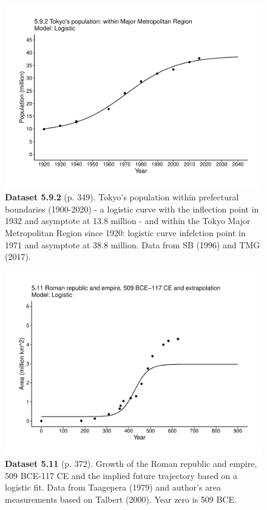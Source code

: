\documentclass[aps,rmp,preprint,superscriptaddress,10pt,onecolumn]{article}
\begin{document}
\clearpage
\begin{figure}[h]
\includegraphics[width=\textwidth]{output/figs-ggplot/5.9.2.pdf}
\caption*{\textbf{Dataset 5.9.2} (p. 349). Tokyo's population within prefectural boundaries (1900-2020) - a logistic curve with the inflection point in 1932 and asymptote at 13.8 million - and within the Tokyo Major Metropolitan Region since 1920: logistic curve infelction point in 1971 and asymptote at 38.8 million. Data from SB (1996) and TMG (2017). }
\end{figure}
	
\clearpage
\begin{figure}[h]
\includegraphics[width=\textwidth]{output/figs-ggplot/5.11.pdf}
\caption*{\textbf{Dataset 5.11} (p. 372). Growth of the Roman republic and empire, 509 BCE-117 CE and the implied future trajectory based on a logistic fit. Data from Taagepera (1979) and author's area measurements based on Talbert (2000). Year zero is 509 BCE. }
\end{figure}
	
\end{document}
